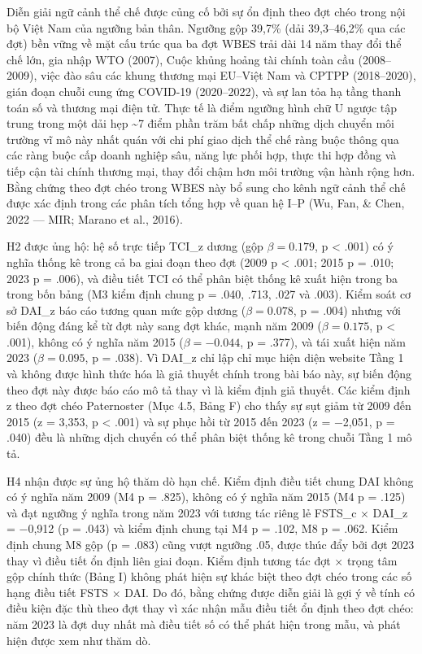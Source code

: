 \documentclass[12pt,a4paper]{article}
\begin{document}
Diễn giải ngữ cảnh thể chế được củng cố bởi sự ổn định theo đợt chéo
trong nội bộ Việt Nam của ngưỡng bản thân. Ngưỡng gộp 39,7\% (dải
39,3--46,2\% qua các đợt) bền vững về mặt cấu trúc qua ba đợt WBES trải
dài 14 năm thay đổi thể chế lớn, gia nhập WTO (2007), Cuộc khủng hoảng
tài chính toàn cầu (2008--2009), việc đào sâu các khung thương mại
EU--Việt Nam và CPTPP (2018--2020), gián đoạn chuỗi cung ứng COVID-19
(2020--2022), và sự lan tỏa hạ tầng thanh toán số và thương mại điện tử.
Thực tế là điểm ngưỡng hình chữ U ngược tập trung trong một dải hẹp
\textasciitilde7 điểm phần trăm bất chấp những dịch chuyển môi trường vĩ
mô này nhất quán với chi phí giao dịch thể chế ràng buộc thông qua các
ràng buộc cấp doanh nghiệp sâu, năng lực phối hợp, thực thi hợp đồng và
tiếp cận tài chính thương mại, thay đổi chậm hơn môi trường vận hành
rộng hơn. Bằng chứng theo đợt chéo trong WBES này bổ sung cho kênh ngữ
cảnh thể chế được xác định trong các phân tích tổng hợp về quan hệ I--P
(Wu, Fan, \& Chen, 2022 --- MIR; Marano et al., 2016).

H2 được ủng hộ: hệ số trực tiếp TCI\_z dương (gộp \(\beta = 0.179\), p
\textless{} .001) có ý nghĩa thống kê trong cả ba giai đoạn theo đợt
(2009 p \textless{} .001; 2015 p = .010; 2023 p = .006), và điều tiết
TCI có thể phân biệt thống kê xuất hiện trong ba trong bốn bảng (M3 kiểm
định chung p = .040, .713, .027 và .003). Kiểm soát cơ sở DAI\_z báo cáo
tương quan mức gộp dương (\(\beta = 0.078\), p = .004) nhưng với biến
động đáng kể từ đợt này sang đợt khác, mạnh năm 2009 (\(\beta = 0.175\),
p \textless{} .001), không có ý nghĩa năm 2015 (\(\beta = −0.044\), p =
.377), và tái xuất hiện năm 2023 (\(\beta = 0.095\), p = .038). Vì
DAI\_z chỉ lập chỉ mục hiện diện website Tầng 1 và không được hình thức
hóa là giả thuyết chính trong bài báo này, sự biến động theo đợt này
được báo cáo mô tả thay vì là kiểm định giả thuyết. Các kiểm định z theo
đợt chéo Paternoster (Mục 4.5, Bảng F) cho thấy sự sụt giảm từ 2009 đến
2015 (z = 3,353, p \textless{} .001) và sự phục hồi từ 2015 đến 2023 (z
= −2,051, p = .040) đều là những dịch chuyển có thể phân biệt thống kê
trong chuỗi Tầng 1 mô tả.

H4 nhận được sự ủng hộ thăm dò hạn chế. Kiểm định điều tiết chung DAI
không có ý nghĩa năm 2009 (M4 p = .825), không có ý nghĩa năm 2015 (M4 p
= .125) và đạt ngưỡng ý nghĩa trong năm 2023 với tương tác riêng lẻ
FSTS\_c × DAI\_z = −0,912 (p = .043) và kiểm định chung tại M4 p = .102,
M8 p = .062. Kiểm định chung M8 gộp (p = .083) cũng vượt ngưỡng .05,
được thúc đẩy bởi đợt 2023 thay vì điều tiết ổn định liên giai đoạn.
Kiểm định tương tác đợt × trọng tâm gộp chính thức (Bảng I) không phát
hiện sự khác biệt theo đợt chéo trong các số hạng điều tiết FSTS × DAI.
Do đó, bằng chứng được diễn giải là gợi ý về tính có điều kiện đặc thù
theo đợt thay vì xác nhận mẫu điều tiết ổn định theo đợt chéo: năm 2023
là đợt duy nhất mà điều tiết số có thể phát hiện trong mẫu, và phát hiện
được xem như thăm dò.
\end{document}
